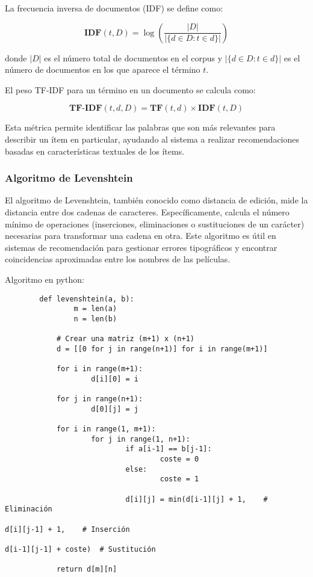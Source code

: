\documentclass{llncs}
\begin{document}
	La frecuencia inversa de documentos (IDF) se define como:
	
	\[
	\textbf{IDF}(t, D) = \log \left(\frac{|D|}{|\{d \in D : t \in d\}|}\right)
	\]
	
	donde \( |D| \) es el número total de documentos en el corpus y \( |\{d \in D : t \in d\}| \) es el número de documentos en los que aparece el término \( t \).
	
	El peso TF-IDF para un término en un documento se calcula como:
	
	\[
	\textbf{TF-IDF}(t, d, D) = \textbf{TF}(t, d) \times \textbf{IDF}(t, D)
	\]
	
	Esta métrica permite identificar las palabras que son más relevantes para describir un ítem en particular, ayudando al sistema a realizar recomendaciones basadas en características textuales de los ítems.
	
	\subsubsection{Algoritmo de Levenshtein}
	El algoritmo de Levenshtein, también conocido como distancia de edición, mide la distancia entre dos cadenas de caracteres. Específicamente, calcula el número mínimo de operaciones (inserciones, eliminaciones o sustituciones de un carácter) necesarias para transformar una cadena en otra. Este algoritmo es útil en sistemas de recomendación para gestionar errores tipográficos y encontrar coincidencias aproximadas entre los nombres de las películas.
	
	Algoritmo en python:
	
	\begin{verbatim}
		def levenshtein(a, b):
				m = len(a)
				n = len(b)
		
			# Crear una matriz (m+1) x (n+1)
			d = [[0 for j in range(n+1)] for i in range(m+1)]
			
			for i in range(m+1):
					d[i][0] = i
			
			for j in range(n+1):
					d[0][j] = j
			
			for i in range(1, m+1):
					for j in range(1, n+1):
							if a[i-1] == b[j-1]:
									coste = 0
							else:
									coste = 1
							
							d[i][j] = min(d[i-1][j] + 1,    # Eliminación
																					d[i][j-1] + 1,    # Inserción
																					d[i-1][j-1] + coste)  # Sustitución
			
			return d[m][n]
	\end{verbatim}
	
\end{document}
